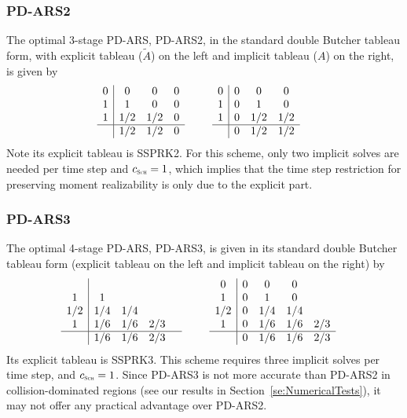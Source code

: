 \subsubsection{PD-ARS2}

The optimal 3-stage PD-ARS, PD-ARS2, in the standard double Butcher tableau form, with explicit tableau ($\tilde{A}$) on the left and implicit tableau ($A$) on the right, is given by
\begin{align}
  &\begin{array}{c | c c c}
  	0 & 0   & 0 & 0 \\
  	1 & 1   & 0 & 0 \\
  	1 & 1/2 & 1/2 & 0 \\ \hline
  	  & 1/2 & 1/2 & 0 
  \end{array}
  \qquad
  \begin{array}{c | c c c}
  	0 & 0 & 0            & 0            \\
  	1 & 0 & 1            & 0            \\
  	1 & 0 & 1/2 & 1/2 \\ \hline
  	  & 0 & 1/2 & 1/2
  \end{array}
\end{align}
Note its explicit tableau is SSPRK2. 
For this scheme, only two implicit solves are needed per time step and $c_{\Sch}= 1$, which implies that the time step restriction for preserving moment realizability is only due to the explicit part.  

\subsubsection{PD-ARS3}

The optimal 4-stage PD-ARS, PD-ARS3, is given in its standard double Butcher tableau form (explicit tableau on the left and implicit tableau on the right) by
\begin{align}
  &\begin{array}{c | c c c c}
  	    &     &     &     &  \\
  	 1  & 1   &     &     &  \\
  	1/2 & 1/4 & 1/4 &  \\
  	 1  & 1/6 & 1/6 & 2/3 &  \\ \hline
  	    & 1/6 & 1/6 & 2/3 &
  \end{array}
  \qquad
  \begin{array}{c | c c c c}
  	0 & 0 & 0            & 0            \\
  	1 & 0 & 1            & 0            \\
  	1/2 & 0 & 1/4 & 1/4 \\ 
  	1 & 0 & 1/6 & 1/6 & 2/3\\\hline
  	  & 0 & 1/6 & 1/6 & 2/3
  \end{array}
\end{align}
Its explicit tableau is SSPRK3. 
This scheme requires three implicit solves per time step, and $c_{\Sch}= 1$.  
Since PD-ARS3 is not more accurate than PD-ARS2 in collision-dominated regions (see our results in Section~\ref{se:NumericalTests}), it may not offer any practical advantage over PD-ARS2.  
